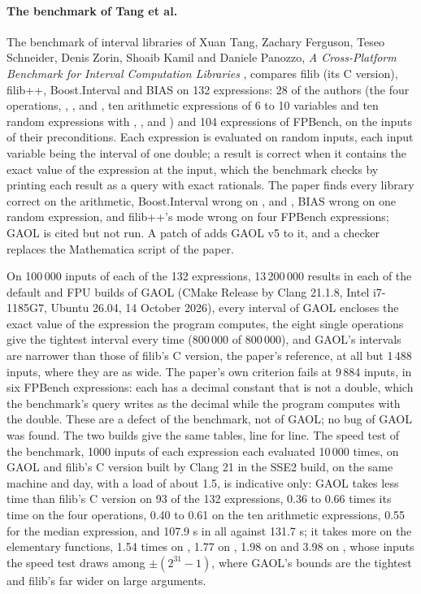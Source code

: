 \paragraph{The benchmark of Tang et al.}
The benchmark of interval libraries of Xuan Tang, Zachary Ferguson, Teseo
Schneider, Denis Zorin, Shoaib Kamil and Daniele Panozzo, \emph{A
Cross-Platform Benchmark for Interval Computation Libraries}
\cite{Tang:PPAM2022}, compares filib
(its C version), filib++, Boost.Interval and BIAS on 132 expressions: 28 of
the authors (the four operations, , ,  and
, ten arithmetic expressions of 6 to 10 variables and ten random
expressions with , ,  and ) and 104
expressions of FPBench, on the inputs of their preconditions. Each
expression is evaluated on random inputs, each input variable being the
interval of one double; a result is correct when it contains the exact
value of the expression at the input, which the benchmark checks by printing
each result as a query with exact rationals. The paper finds every library
correct on the arithmetic, Boost.Interval wrong on , 
and , BIAS wrong on one random expression, and filib++'s
 mode wrong on four FPBench expressions; GAOL is
cited but not run. A patch of  adds GAOL v5 to
it, and a checker replaces the Mathematica script of the paper.

\medskip
On 100\,000 inputs of each of the 132 expressions, 13\,200\,000 results in
each of the default and FPU builds of GAOL (CMake Release by Clang 21.1.8,
Intel i7-1185G7, Ubuntu 26.04, 14 October 2026), every interval of GAOL
encloses the exact value of the expression the program computes, the eight
single operations give the tightest interval every time (800\,000 of
800\,000), and GAOL's intervals are narrower than those of filib's C
version, the paper's reference, at all but 1\,488 inputs, where they are as
wide. The paper's own criterion fails at 9\,884 inputs, in six
FPBench expressions: each has a decimal constant that is not a double, which
the benchmark's query writes as the decimal while the program computes with
the double. These are a defect of the benchmark, not of GAOL; no bug of GAOL
was found. The two builds give the same tables, line for line. The speed
test of the benchmark, 1000 inputs of each expression each evaluated 10\,000
times, on GAOL and filib's C version built by Clang 21 in the SSE2 build, on
the same machine and day, with a load of about 1.5, is indicative only: GAOL
takes less time than filib's C version on 93 of the 132 expressions, 0.36
to 0.66 times its time on the four operations, 0.40 to 0.61 on the ten
arithmetic expressions, 0.55 for the median expression, and 107.9 s in all
against 131.7 s; it takes more on the elementary functions, 1.54 times on
, 1.77 on , 1.98 on  and 3.98 on ,
whose inputs the speed test draws among $\pm(2^{31} - 1)$, where GAOL's
bounds are the tightest and filib's far wider on large arguments.

